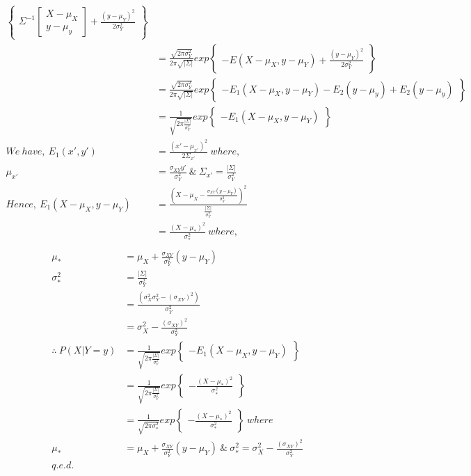 \documentclass[a4paper,fleqn,11pt]{article}
\theoremstyle{mytheor}
\begin{document}
\begin{align*}
\begin{Bmatrix}
		   	  \Sigma^{-1}
		      \begin{bmatrix}
		   		X - \mu_X \\
				y - \mu_y
			  \end{bmatrix}
			  + \frac{(y - \mu_Y)^2}{2\sigma^2_Y}
		\end{Bmatrix} \\
& = \frac{\sqrt{2\pi\sigma^2_Y}}{2\pi \sqrt{|\Sigma|}}
	exp \begin{Bmatrix}
		      -E (X - \mu_X, y - \mu_Y)
			  + \frac{(y - \mu_Y)^2}{2\sigma^2_Y}
		\end{Bmatrix} \\
& = \frac{\sqrt{2\pi\sigma^2_Y}}{2\pi \sqrt{|\Sigma|}}
	exp \begin{Bmatrix}
		      -E_1 (X - \mu_X, y - \mu_Y) - E_2 (y - \mu_y)
			  + E_2 (y - \mu_y)
		\end{Bmatrix} \\
& = \frac{1}{\sqrt{2\pi \frac{|\Sigma|}{\sigma^2_Y}}}
	exp \begin{Bmatrix}
		      -E_1 (X - \mu_X, y - \mu_Y)
		\end{Bmatrix} \\
We\ have,\ E_1 (x', y') & = \frac{(x' - \mu_{x'})^2}{2\Sigma_{x'}}\ where, \\  \mu_{x'} & = \frac{\sigma_{XY} y'}{\sigma^2_Y}\ \&\
\Sigma_{x'} = \frac{|\Sigma|}{\sigma^2_Y} \\
Hence,\ E_1 (X - \mu_X, y - \mu_Y) & =
\frac{(X - \mu_X - \frac{\sigma_{XY} (y - \mu_Y)}{\sigma^2_Y})^2}
	 {\frac{|\Sigma|}{\sigma^2_Y}} \\
& = \frac{(X - \mu_*)^2}
	 {\sigma^2_*}\ where,\\
\end{align*}
\begin{align*}
\mu_* & = \mu_X + \frac{\sigma_{XY}}{\sigma^2_Y}(y - \mu_Y) \\
\sigma^2_* & = \frac{|\Sigma|}{\sigma^2_Y} \\
& = \frac{(\sigma^2_X \sigma^2_Y - (\sigma_{XY})^2)}{\sigma^2_Y} \\
& = \sigma^2_X - \frac{(\sigma_{XY})^2}{\sigma^2_Y} \\
\therefore\ P (X|Y = y) & = \frac{1}
								  {\sqrt{2\pi \frac{|\Sigma|}
								   					 {\sigma^2_Y}}}
							 exp \begin{Bmatrix}
						      		-E_1 (X - \mu_X, y - \mu_Y)
								 \end{Bmatrix} \\
& = \frac{1}{\sqrt{2\pi \frac{|\Sigma|}
							  {\sigma^2_Y}}}
	exp \begin{Bmatrix}
		-\frac{(X - \mu_*)^2}
			  {\sigma^2_*}
	\end{Bmatrix} \\
& = \frac{1}{\sqrt{2\pi\sigma^2_*}}
	exp \begin{Bmatrix}
		-\frac{(X - \mu_*)^2}
			  {\sigma^2_*}
	\end{Bmatrix}\ where \\
\mu_* & = \mu_X + \frac{\sigma_{XY}}{\sigma^2_Y}(y - \mu_Y)\ \&\
\sigma^2_* = \sigma^2_X - \frac{(\sigma_{XY})^2}{\sigma^2_Y} \\
q.e.d.
\end{align*}
\end{document}

